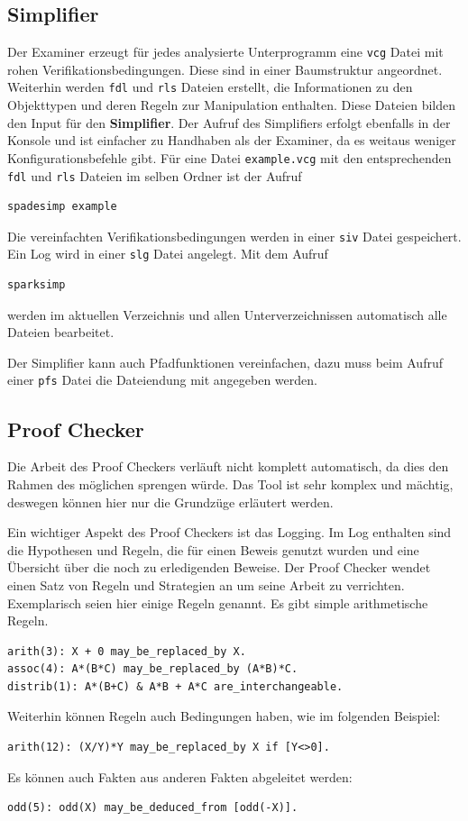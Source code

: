 \subsection{Simplifier}
Der Examiner erzeugt für jedes analysierte Unterprogramm eine \texttt{vcg} Datei mit rohen Verifikationsbedingungen. Diese sind in einer Baumstruktur angeordnet. Weiterhin werden \texttt{fdl} und \texttt{rls} Dateien erstellt, die Informationen zu den Objekttypen und deren Regeln zur Manipulation enthalten. Diese Dateien bilden den Input für den \textbf{Simplifier}.
Der Aufruf des Simplifiers erfolgt ebenfalls in der Konsole und ist einfacher zu Handhaben als der Examiner, da es weitaus weniger Konfigurationsbefehle gibt. Für eine Datei \texttt{example.vcg} mit den entsprechenden \texttt{fdl} und \texttt{rls} Dateien im selben Ordner ist der Aufruf

\begin{verbatim}
spadesimp example
\end{verbatim}

Die vereinfachten Verifikationsbedingungen werden in einer \texttt{siv} Datei gespeichert. Ein Log wird in einer \texttt{slg} Datei angelegt.
Mit dem Aufruf
\begin{verbatim}
sparksimp
\end{verbatim}
werden im aktuellen Verzeichnis und allen Unterverzeichnissen automatisch alle Dateien bearbeitet.

Der Simplifier kann auch Pfadfunktionen vereinfachen, dazu muss beim Aufruf einer \texttt{pfs} Datei die Dateiendung mit angegeben werden. 

\subsection{Proof Checker}
Die Arbeit des Proof Checkers verläuft nicht komplett automatisch, da dies den Rahmen des möglichen sprengen würde. Das Tool ist sehr komplex und mächtig, deswegen können hier nur die Grundzüge erläutert werden.

Ein wichtiger Aspekt des Proof Checkers ist das Logging. Im Log enthalten sind die Hypothesen und Regeln, die für einen Beweis genutzt wurden und eine Übersicht über die noch zu erledigenden Beweise.
Der Proof Checker wendet einen Satz von Regeln und Strategien an um seine Arbeit zu verrichten. Exemplarisch seien hier einige Regeln genannt. Es gibt simple arithmetische Regeln.
\begin{verbatim}
arith(3): X + 0 may_be_replaced_by X.
assoc(4): A*(B*C) may_be_replaced_by (A*B)*C.
distrib(1): A*(B+C) & A*B + A*C are_interchangeable.
\end{verbatim} 
Weiterhin können Regeln auch Bedingungen haben, wie im folgenden Beispiel:
\begin{verbatim}
arith(12): (X/Y)*Y may_be_replaced_by X if [Y<>0].
\end{verbatim}
Es können auch Fakten aus anderen Fakten abgeleitet werden:
\begin{verbatim}
odd(5): odd(X) may_be_deduced_from [odd(-X)].
\end{verbatim}

